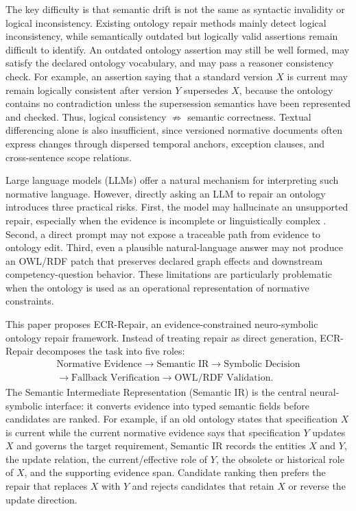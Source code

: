 \documentclass[conference]{IEEEtran}
\begin{document}
The key difficulty is that semantic drift is not the same as syntactic invalidity or logical inconsistency. Existing ontology repair methods mainly detect logical inconsistency, while semantically outdated but logically valid assertions remain difficult to identify. An outdated ontology assertion may still be well formed, may satisfy the declared ontology vocabulary, and may pass a reasoner consistency check. For example, an assertion saying that a standard version $X$ is current may remain logically consistent after version $Y$ supersedes $X$, because the ontology contains no contradiction unless the supersession semantics have been represented and checked. Thus, logical consistency $\not\Rightarrow$ semantic correctness. Textual differencing alone is also insufficient, since versioned normative documents often express changes through dispersed temporal anchors, exception clauses, and cross-sentence scope relations.

Large language models (LLMs) offer a natural mechanism for interpreting such normative language. However, directly asking an LLM to repair an ontology introduces three practical risks. First, the model may hallucinate an unsupported repair, especially when the evidence is incomplete or linguistically complex \cite{ji2023hallucination}. Second, a direct prompt may not expose a traceable path from evidence to ontology edit. Third, even a plausible natural-language answer may not produce an OWL/RDF patch that preserves declared graph effects and downstream competency-question behavior. These limitations are particularly problematic when the ontology is used as an operational representation of normative constraints.

This paper proposes ECR-Repair, an evidence-constrained neuro-symbolic ontology repair framework. Instead of treating repair as direct generation, ECR-Repair decomposes the task into five roles:
\[
\begin{gathered}
\text{Normative Evidence}
\rightarrow
\text{Semantic IR}
\rightarrow
\text{Symbolic Decision}\\
\rightarrow
\text{Fallback Verification}
\rightarrow
\text{OWL/RDF Validation}.
\end{gathered}
\]
The Semantic Intermediate Representation (Semantic IR) is the central neural-symbolic interface: it converts evidence into typed semantic fields before candidates are ranked. For example, if an old ontology states that specification $X$ is current while the current normative evidence says that specification $Y$ updates $X$ and governs the target requirement, Semantic IR records the entities $X$ and $Y$, the update relation, the current/effective role of $Y$, the obsolete or historical role of $X$, and the supporting evidence span. Candidate ranking then prefers the repair that replaces $X$ with $Y$ and rejects candidates that retain $X$ or reverse the update direction.
\end{document}
